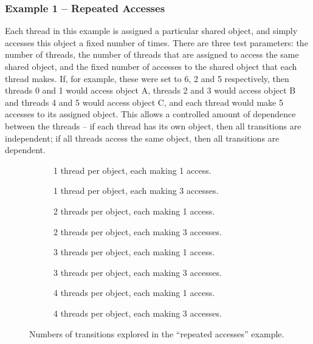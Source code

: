 \documentclass[12pt,a4paper,twoside,openright]{report}
\newenvironment{figtile} %
{\begin{subfigure}{0.48\textwidth}
		\def\svgwidth{\textwidth}
		\captionsetup{font=footnotesize}
	}
	{\end{subfigure}}
\begin{document}
\subsubsection{Example 1 -- Repeated Accesses}
Each thread in this example is assigned a particular
shared object, and simply accesses this object a
fixed number of times. There are three test parameters:
the number of threads, the number of threads that are
assigned to access the same shared object, and the fixed
number of accesses to the shared object that each thread
makes. If, for example, these were set to 6, 2 and 5
respectively, then threads 0 and 1 would access object A,
threads 2 and 3 would access object B and threads 4 and 5
would access object C, and each thread would make 5 accesses
to its assigned object. This allows a controlled amount of
dependence between the threads -- if each thread has its own
object, then all transitions are independent; if all threads
access the same object, then all transitions are dependent.

\begin{figure}
	\centering
	\footnotesize
	\begin{figtile}
		
		\caption{1 thread per object,
			each making 1 access.}
	\end{figtile}%
	\quad
	\begin{figtile}
		
		\caption{1 thread per object,
			each making 3 accesses.}
	\end{figtile}
	\begin{figtile}
		
		\caption{2 threads per object,
			each making 1 access.}
	\end{figtile}%
	\quad
	\begin{figtile}
		
		\caption{2 threads per object,
			each making 3 accesses.}
	\end{figtile}
	\begin{figtile}
		
		\caption{3 threads per object,
			each making 1 access.}
	\end{figtile}%
	\quad
	\begin{figtile}
		
		\caption{3 threads per object,
			each making 3 accesses.}
	\end{figtile}
	\begin{figtile}
		
		\caption{4 threads per object,
			each making 1 access.}
	\end{figtile}%
	\quad
	\begin{figtile}
		
		\caption{4 threads per object,
			each making 3 accesses.}
		\label{fig:repeated-access-trans-h}
	\end{figtile}
	\caption{Numbers of transitions
		explored in the ``repeated accesses'' example.}
	\label{fig:repeated-access-trans}
\end{figure}
\end{document}
